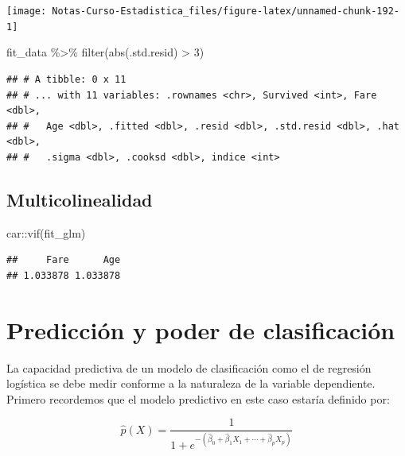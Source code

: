 \documentclass[
  12pt,
]{book}
\newenvironment{Shaded}{\begin{snugshade}}{\end{snugshade}}
\newcommand{\DecValTok}[1]{\textcolor[rgb]{0.00,0.00,0.81}{#1}}
\newcommand{\FunctionTok}[1]{\textcolor[rgb]{0.00,0.00,0.00}{#1}}
\newcommand{\NormalTok}[1]{#1}
\newcommand{\SpecialCharTok}[1]{\textcolor[rgb]{0.00,0.00,0.00}{#1}}
\theoremstyle{definition}
\theoremstyle{definition}
\theoremstyle{definition}
\theoremstyle{definition}
\theoremstyle{remark}
\begin{document}
\begin{center}\texttt{[image: Notas-Curso-Estadistica\_files/figure-latex/unnamed-chunk-192-1]} \end{center}

\begin{Shaded}
\begin{Highlighting}[]
\NormalTok{fit\_data }\SpecialCharTok{\%\textgreater{}\%}
    \FunctionTok{filter}\NormalTok{(}\FunctionTok{abs}\NormalTok{(.std.resid) }\SpecialCharTok{\textgreater{}} \DecValTok{3}\NormalTok{)}
\end{Highlighting}
\end{Shaded}

\begin{verbatim}
## # A tibble: 0 x 11
## # ... with 11 variables: .rownames <chr>, Survived <int>, Fare <dbl>,
## #   Age <dbl>, .fitted <dbl>, .resid <dbl>, .std.resid <dbl>, .hat <dbl>,
## #   .sigma <dbl>, .cooksd <dbl>, indice <int>
\end{verbatim}

\hypertarget{multicolinealidad-1}{%
\subsection{Multicolinealidad}\label{multicolinealidad-1}}

\begin{Shaded}
\begin{Highlighting}[]
\NormalTok{car}\SpecialCharTok{::}\FunctionTok{vif}\NormalTok{(fit\_glm)}
\end{Highlighting}
\end{Shaded}

\begin{verbatim}
##     Fare      Age 
## 1.033878 1.033878
\end{verbatim}

\hypertarget{predicciuxf3n-y-poder-de-clasificaciuxf3n}{%
\section{Predicción y poder de clasificación}\label{predicciuxf3n-y-poder-de-clasificaciuxf3n}}

La capacidad predictiva de un modelo de clasificación como el de regresión logística se debe medir conforme a la naturaleza de la variable dependiente. Primero recordemos que el modelo predictivo en este caso estaría definido por:

\begin{equation*}
\hat{p}(X)=\frac{1}{1+e^{-(\hat{\beta}_{0}+\hat{\beta}_{1} X_{1}+\cdots+\hat{\beta}_{p} X_{p})}}
\end{equation*}
\end{document}
